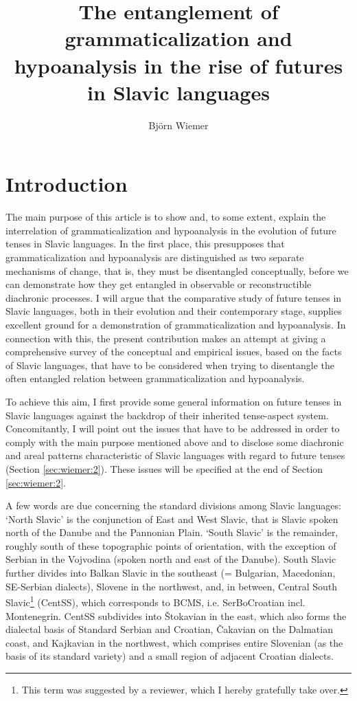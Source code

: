 \documentclass[output=paper,colorlinks,citecolor=brown]{langscibook}
\author{Björn Wiemer\orcid{}\affiliation{Johannes Gutenberg-Universität Mainz}}
\title[{The entanglement of grammaticalization and hypoanalysis}]{The entanglement of grammaticalization and hypoanalysis in the rise of futures in Slavic languages}
\begin{document}
\maketitle

\section{Introduction} \label{sec:wiemer:1}
The main purpose of this article is to show and, to some extent, explain the interrelation of grammaticalization and hypoanalysis in the evolution of future tenses in Slavic languages. In the first place, this presupposes that grammaticalization and hypoanalysis are distinguished as two separate mechanisms of change, that is, they must be disentangled conceptually, before we can demonstrate how they get entangled in observable or reconstructible diachronic processes. I will argue that the comparative study of future tenses in Slavic languages, both in their evolution and their contemporary stage, supplies excellent ground for a demonstration of grammaticalization and hypoanalysis. In connection with this, the present contribution makes an attempt at giving a comprehensive survey of the conceptual and empirical issues, based on the facts of Slavic languages, that have to be considered when trying to disentangle the often entangled relation between grammaticalization and hypoanalysis.

To achieve this aim, I first provide some general information on future tenses in Slavic languages against the backdrop of their inherited tense-aspect system. Concomitantly, I will point out the issues that have to be addressed in order to comply with the main purpose mentioned above and to disclose some diachronic and areal patterns characteristic of Slavic languages with regard to future tenses (Section \ref{sec:wiemer:2}). These issues will be specified at the end of Section \ref{sec:wiemer:2}.

A few words are due concerning the standard divisions among Slavic languages: ‘North Slavic’ is the conjunction of East and West Slavic, that is Slavic spoken north of the Danube and the Pannonian Plain. ‘South Slavic’ is the remainder, roughly south of these topographic points of orientation, with the exception of Serbian in the Vojvodina (spoken north and east of the Danube). South Slavic further divides into Balkan Slavic in the southeast (= Bulgarian, Macedonian, SE-Serbian dialects), Slovene in the northwest, and, in between, Central South Slavic\footnote{This term was suggested by a reviewer, which I hereby gratefully take over.} (CentSS), which corresponds to BCMS, i.e. SerBoCroatian incl. Montenegrin. CentSS subdivides into Štokavian in the east, which also forms the dialectal basis of Standard Serbian and Croatian, Čakavian on the Dalmatian coast, and Kajkavian in the northwest, which comprises entire Slovenian (as the basis of its standard variety) and a small region of adjacent Croatian dialects.
\end{document}
